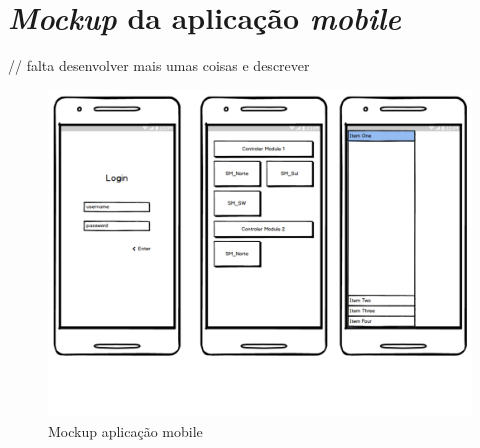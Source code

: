 \chapter{\textit{Mockup} da aplicação \textit{mobile}}
\label{Mockup}

// falta desenvolver mais umas coisas e descrever

\begin{figure}[h]
	\centering
	\includegraphics[width=\linewidth]{esquemas/mockup.pdf}
	\caption{Mockup aplicação mobile}
	\label{dikw}
\end{figure}
